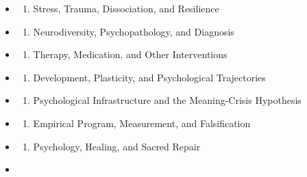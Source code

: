 \documentclass[
  11pt,
]{article}
\providecommand{\tightlist}{%
  \setlength{\itemsep}{0pt}\setlength{\parskip}{0pt}}
\begin{document}
\begin{itemize}
\begin{enumerate}
  \tightlist
  \item
    Attachment, Sexuality, Intimacy, and Co-Regulation
  \end{enumerate}
\item
  \begin{enumerate}
  \def\labelenumi{\arabic{enumi}.}
  \setcounter{enumi}{6}
  \tightlist
  \item
    Stress, Trauma, Dissociation, and Resilience
  \end{enumerate}
\item
  \begin{enumerate}
  \def\labelenumi{\arabic{enumi}.}
  \setcounter{enumi}{7}
  \tightlist
  \item
    Neurodiversity, Psychopathology, and Diagnosis
  \end{enumerate}
\item
  \begin{enumerate}
  \def\labelenumi{\arabic{enumi}.}
  \setcounter{enumi}{8}
  \tightlist
  \item
    Therapy, Medication, and Other Interventions
  \end{enumerate}
\item
  \begin{enumerate}
  \def\labelenumi{\arabic{enumi}.}
  \setcounter{enumi}{9}
  \tightlist
  \item
    Development, Plasticity, and Psychological Trajectories
  \end{enumerate}
\item
  \begin{enumerate}
  \def\labelenumi{\arabic{enumi}.}
  \setcounter{enumi}{10}
  \tightlist
  \item
    Psychological Infrastructure and the Meaning-Crisis Hypothesis
  \end{enumerate}
\item
  \begin{enumerate}
  \def\labelenumi{\arabic{enumi}.}
  \setcounter{enumi}{11}
  \tightlist
  \item
    Empirical Program, Measurement, and Falsification
  \end{enumerate}
\item
  \begin{enumerate}
  \def\labelenumi{\arabic{enumi}.}
  \setcounter{enumi}{12}
  \tightlist
  \item
    Psychology, Healing, and Sacred Repair
  \end{enumerate}
\item
  \begin{enumerate}

\end{enumerate}
\end{itemize}
\end{document}
